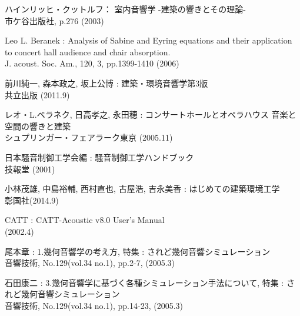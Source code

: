 \begin{bib}[100]
\thispagestyle{fancy}


  ハインリッヒ・クットルフ：
  \newblock 室内音響学 -建築の響きとその理論-
  \newblock \\ 市ケ谷出版社, p.276 (2003)

  Leo L. Beranek : 
  \newblock Analysis of Sabine and Eyring equations and their  application to concert hall audience and chair absorption.
  \newblock \\ J. acoust. Soc. Am., 120, 3, pp.1399-1410 (2006)

  前川純一, 森本政之, 坂上公博 : 
  \newblock 建築・環境音響学第3版
  \newblock \\ 共立出版 (2011.9)
  
  レオ・L.ベラネク, 日高孝之, 永田穂 : 
  \newblock コンサートホールとオペラハウス 音楽と空間の響きと建築
  \newblock \\ シュプリンガー・フェアラーク東京 (2005.11)

  日本騒音制御工学会編 : 
  \newblock 騒音制御工学ハンドブック
  \newblock \\ 技報堂 (2001)

  小林茂雄, 中島裕輔, 西村直也, 古屋浩, 吉永美香 : 
  \newblock はじめての建築環境工学
  \newblock \\彰国社(2014.9)

  CATT : 
  \newblock CATT-Acoustic v8.0 User's Manual
  \newblock \\(2002.4)

  尾本章 : 
  \newblock 1.幾何音響学の考え方, 特集 : されど幾何音響シミュレーション
  \newblock \\音響技術, No.129(vol.34 no.1), pp.2-7, (2005.3)

  石田康二 : 
  \newblock 3.幾何音響学に基づく各種シミュレーション手法について, 特集 : されど幾何音響シミュレーション
  \newblock \\音響技術, No.129(vol.34 no.1), pp.14-23, (2005.3)

 \end{bib}